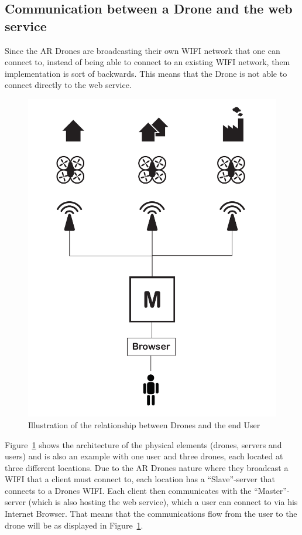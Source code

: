 \subsection{Communication between a Drone and the web service}
Since the AR Drones are broadcasting their own WIFI network that one can connect to, instead of being able to connect to an existing WIFI network, them implementation is sort of backwards. 
This means that the Drone is not able to connect directly to the web service. 

\begin{figure}[htb]
    \centering
    \includegraphics[width=\textwidth]{gfx/technical_structure.pdf}
    \caption{Illustration of the relationship between Drones and the end User}
    \label{fig:Technical_Structure}
\end{figure}

Figure~\ref{fig:Technical_Structure} shows the architecture of the physical elements (drones, servers and users) and is also an example with one user and three drones, each located at three different locations.
Due to the AR Drones nature where they broadcast a WIFI that a client must connect to, each location has a ``Slave''-server that connects to a Drones WIFI. 
Each client then communicates with the ``Master''-server (which is also hosting the web service), which a user can connect to via his Internet Browser. 
That means that the communications flow from the user to the drone will be as displayed in Figure~\ref{fig:Technical_Structure}.
